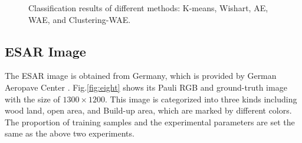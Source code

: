 \documentclass[11pt, a4paper, onecolumn, oneside]{article}
\begin{document}
\begin{figure}
\caption{Classification results of different methods: K-means, Wishart, AE, WAE, and Clustering-WAE.}
\label{fig:seven}
\end{figure}

\subsection{ESAR Image}

The ESAR image is obtained from Germany, which is provided by German Aeropave Center \cite{c}. Fig.\ref{fig:eight} shows its Pauli RGB and ground-truth image with the size of $1300\times 1200$. This image is categorized into three kinds including wood land, open area, and Build-up area, which are marked by different colors. The proportion of training samples and the experimental parameters are set the same as the above two experiments. 
\end{document}

